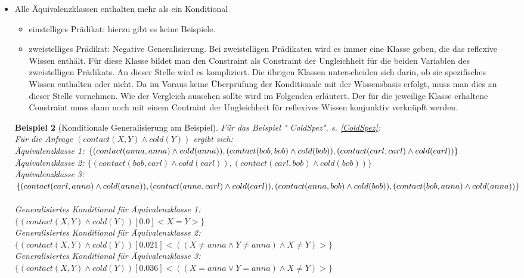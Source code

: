 \documentclass[a4paper, 11pt]{book}
\newtheorem{Bsp}{Beispiel}[section]
\begin{document}
\begin{itemize}
\begin{itemize}
\begin{Bsp}[Konditionale Generalisierung ]
		\end{Bsp}
		\item zweistelliges Prädikat:\\	
		Dieser Fall kommt nicht vor, da die Klassen bei zweistelligen Prädikaten mindestens zwei Element enthalten.	
	\end{itemize}
	\item Alle Äquivalenzklassen enthalten mehr als ein Konditional
	\begin{itemize}
		\item einstelliges Prädikat: hierzu gibt es keine Beispiele.
		\item zweistelliges Prädikat: Negative Generalisierung. Bei zweistelligen Prädikaten wird es immer eine Klasse geben, die das reflexive Wissen enthält. Für diese Klasse bildet man den Constraint als Constraint der Ungleichheit für die beiden Variablen des zweistelligen Prädikats. An dieser Stelle wird es kompliziert. Die übrigen Klassen unterscheiden sich darin, ob sie spezifisches Wissen enthalten oder nicht. Da im Voraus keine Überprüfung der Konditionale mit der Wissensbasis erfolgt, muss man dies an dieser Stelle vornehmen. Wie der Vergleich aussehen sollte wird im Folgenden erläutert. Der für die jeweilige Klasse erhaltene Constraint muss dann noch mit einem Contraint der Ungleichheit für reflexives Wissen konjunktiv verknüpft werden. 
		\end{itemize}

		\begin{Bsp}[Konditionale Generalisierung am Beispiel]
			Für  das Beispiel "{} ColdSpez"{}, s. \ref{ColdSpez}:\\
			Für die Anfrage $ (contact(X,Y) \land cold(Y)) $ ergibt sich:\\
			Äquivalenzklasse 1: $ \{(contact(anna,anna) \land cold(anna)), (contact(bob,bob) \land cold(bob)), \\(contact(carl,carl) \land cold(carl)) \} $\\
			Äquivalenzklasse 2: $ \{(contact(bob,carl) \land cold(carl)), (contact(carl,bob) \land cold(bob)) \} $\\
			Äquivalenzklasse 3: $ \{(contact(carl,anna) \land cold(anna)), (contact(anna, carl) \land\\ cold(carl)), (contact(anna,bob) \land cold(bob)), (contact(bob, anna) \land cold(anna)) \} $\\
			\\
			\noindent
			Generalisiertes Konditional für Äquivalenzklasse 1: \\$ \{(contact(X,Y) \land cold(Y)) [0.0] <X = Y>\} $\\
			Generalisiertes Konditional für Äquivalenzklasse 2: \\$ \{(contact(X,Y) \land cold(Y)) [0.021] <((X \neq anna \land Y \neq anna) \land X \neq Y)>\} $\\
			Generalisiertes Konditional für Äquivalenzklasse 3:\\ $ \{(contact(X,Y) \land cold(Y)) [0.036] <((X = anna \lor Y = anna)\land X \neq Y)>\} $	
		\end{Bsp}
	
\end{itemize}
\end{document}

